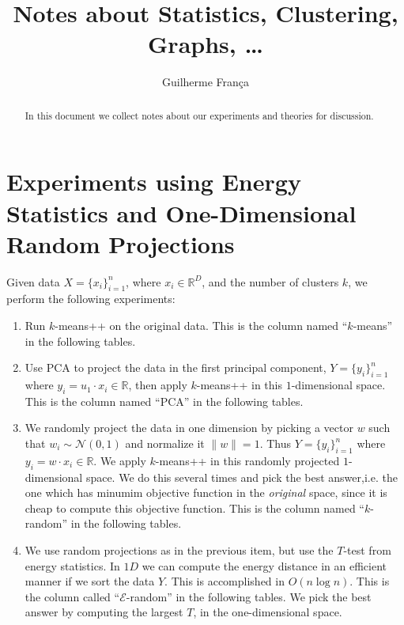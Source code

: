\documentclass[aps,preprint,nofootinbib,floatfix]{revtex4-1}
\begin{document}
\title{Notes about Statistics, Clustering, Graphs, \ldots}

\author{Guilherme Fran\c ca}

\begin{abstract}
In this document we collect notes about our experiments and theories
for discussion.
\end{abstract}

\maketitle


\section{Experiments using Energy Statistics and One-Dimensional 
Random Projections}

Given data $X=\{ x_i \}_{i=1}^{n}$, where $x_i \in \mathbb{R}^{D}$, 
and the number of clusters $k$, we perform the following experiments:
\begin{enumerate}
\item Run $k$-means++ 
on the original data. This is the column named 
``$k$-means'' in the following tables.
\item Use PCA to 
project the data in the first principal component, 
$Y=\{ y_i \}_{i=1}^n$ where $y_i = u_{1}\cdot x_i \in \mathbb{R}$, then
apply $k$-means++ in this $1$-dimensional space. This is the column named
``PCA'' in the following tables.
\item We randomly project the data in one dimension by picking a vector
$w$ such that $w_i \sim \mathcal{N}(0,1)$ and normalize it $\| w \|=1$.
Thus $Y = \{y_i\}_{i=1}^n $ where $y_i = w\cdot x_i \in \mathbb{R}$. 
We apply $k$-means++ in this randomly projected
$1$-dimensional space. We do this several times and pick the best answer,i.e.
the one which has minumim objective function in the \emph{original} space,
since it is cheap to compute this objective function.
This is the column named ``$k$-random'' in the following tables.
\item We use random projections as in the previous item, but use the $T$-test
from energy statistics. In $1D$ we can compute the energy distance in an
efficient manner if we sort the data $Y$. This is accomplished in
$O(n\log n)$. This is the column called
``$\mathcal{E}$-random'' in the following tables. We pick the best answer
by computing the largest $T$, in the one-dimensional space.
\end{enumerate}
\end{document}
